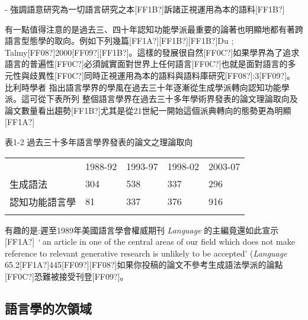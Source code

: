{}-  強調語意研究為一切語言研究之本[FF1B?]訴諸正視運用為本的語料[FF1B?]

有一點值得注意的是過去三、四十年認知功能學派最重要的論著也明顯地都有著跨語言型態學的取向。例如下列幾篇[FF1A?]\parencite{Givon1979}[FF1B?]\parencite{HopperThompson1980}[FF1B?]Du \parencite{Bois1987}; Talmy[FF08?]2000[FF09?][FF1B?]\parencite{Bybee2010}。這樣的發展很自然[FF0C?]如果學界為了追求語言的普遍性[FF0C?]必須誠實面對世界上任何語言[FF0C?]也就是面對語言的多元性與歧異性[FF0C?]同時正視運用為本的語料與語料庫研究[FF08?]\citealt{Langacker1987}:3[FF09?]。比利時學者\parencite{Geeraerts2010} 指出語言學界的學風在過去三十年逐漸從生成學派轉向認知功能學派。這可從下表所列 整個語言學界在過去三十多年學術界發表的論文理論取向及論文數量看出趨勢[FF1B?]尤其是從21世紀一開始這個派典轉向的態勢更為明顯[FF1A?]

表1-2  過去三十多年語言學界發表的論文之理論取向

\tablefirsthead{}

\tabletail{}
\tablelasttail{}
\begin{tabularx}{\textwidth}{XXXXX} & 1988-92 & 1993-97 & 1998-02 & 2003-07\\
\lsptoprule
生成語法 & 304 & 538 & 337 & 296\\
認知功能語言學 & 81 & 337 & 376 & 916\\
\lspbottomrule
\end{tabularx}
有趣的是:遲至1989年美國語言學會權威期刊 \textit{Language} 的主編竟還如此宣示[FF1A?] \textit{‘} an article in one of the central areas of our field which does not make reference to relevant generative research is unlikely to be accepted’ (\textit{Language} 65.2[FF1A?]445[FF09?][FF08?]如果你投稿的論文不參考生成語法學派的論點[FF0C?]恐難被接受刊登[FF09?]。

\subsection{語言學的次領域} %

